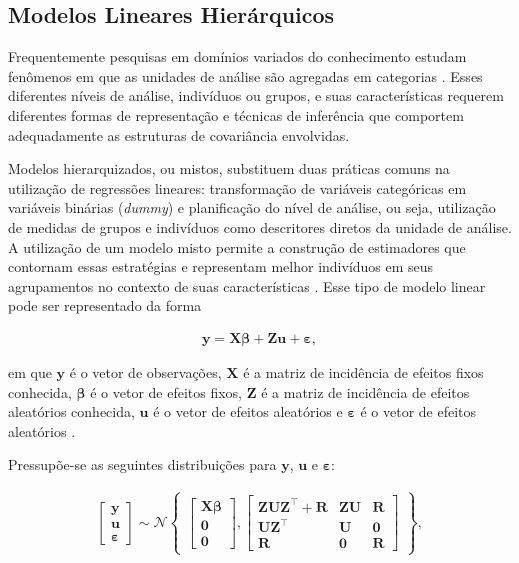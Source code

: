 \documentclass[12pt, a4paper, twoside]{report}
\numberwithin{equation}{subsection} %
\begin{document}
\subsection{Modelos Lineares Hierárquicos}

Frequentemente pesquisas em domínios variados do conhecimento estudam fenômenos em que as unidades de análise são agregadas em categorias \citep{adewale2007understanding, mcmahon2007scales}. Esses diferentes níveis de análise, indivíduos ou grupos, e suas características requerem diferentes formas de representação e técnicas de inferência que comportem adequadamente as estruturas de covariância envolvidas.

Modelos hierarquizados, ou mistos, substituem duas práticas comuns na utilização de regressões lineares: transformação de variáveis categóricas em variáveis binárias (\textit{dummy}) e planificação do nível de análise, ou seja, utilização de medidas de grupos e indivíduos como descritores diretos da unidade de análise. A utilização de um modelo misto permite a construção de estimadores que contornam essas estratégias e representam melhor indivíduos em seus agrupamentos no contexto de suas características \citep{hox2017multilevel, gelman_hill_2007}. Esse tipo de modelo linear pode ser representado da forma


\begin{align}
	\mathbf{y} = \mathbf{X} \boldsymbol{\beta} + \mathbf{Z}\boldsymbol{u} + \boldsymbol{\varepsilon}, \label{213}
\end{align}

\noindent em que $\mathbf{y}$ é o vetor de observações, $\mathbf{X}$ é a matriz de incidência de efeitos fixos conhecida, $\boldsymbol{\beta}$ é o vetor de efeitos fixos, $\mathbf{Z}$ é a matriz de incidência de efeitos aleatórios conhecida, $\boldsymbol{u}$ é o vetor de efeitos aleatórios e $\boldsymbol{\varepsilon}$ é o vetor de efeitos aleatórios \citep{modelos_mistos_ufv}.

Pressupõe-se as seguintes distribuições para $\mathbf{y}$, $\boldsymbol{u}$ e $\boldsymbol{\varepsilon}$:

\begin{align}
	\begin{bmatrix}
		\mathbf{y} \\ 
		\boldsymbol{u} \\ 
		\boldsymbol{\varepsilon} 
	\end{bmatrix}
	\sim \mathcal{N} 
	\begin{Bmatrix}
		\begin{bmatrix}
			\mathbf{X}\boldsymbol{\beta} \\ \mathbf{0} \\ \mathbf{0}
		\end{bmatrix}, 
		\begin{bmatrix}
			\mathbf{ZUZ}^\top + \mathbf{R} & \mathbf{ZU} & \mathbf{R} \\
			\mathbf{UZ}^\top & \mathbf{U} & \mathbf{0} \\
			\mathbf{R} & \mathbf{0} & \mathbf{R}
		\end{bmatrix}
	\end{Bmatrix}, \label{eq:modelo-misto}
\end{align}
\end{document}
